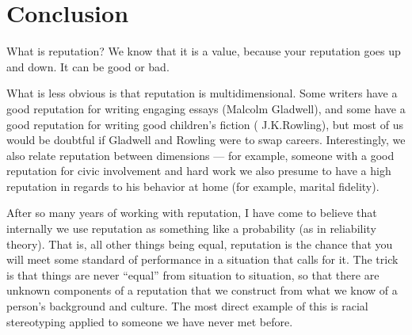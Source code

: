 \section{Conclusion}

\begin{comment}
Used to filter too much information, as in page rank.
But also used to encourage desirable behavior
(and discourage undesirable behavior).

Does a vandal to Wikipedia care that his reputation is
tarnished?  What kind of punishment is this?

Applications: peer review, text trust, sexual offender registry, job references.
Can we use reputation to figure out whether people
fit into a company culture?

What if web search rankings were done incrementally
instead of globally?  Would this give higher reputation
to \textit{fresh} parts of the web, and gracefully
phase out crufty parts?  Crucial to this would be the
need to update reputation based on page views, or
people following links from Facebook/Google, so that
we know that a static page is still actually relevant.
\end{comment}

What is reputation?  We know that it is a value, because your reputation goes
up and down. It can be good or bad.

What is less obvious is that reputation is multidimensional.  Some writers have
a good reputation for writing engaging essays (\eg Malcolm Gladwell), and some
have a good reputation for writing good children's fiction (\eg
J.\thinspace K.\thinspace Rowling),
but most of us would be doubtful if Gladwell and Rowling were to swap careers.
Interestingly, we also relate reputation between
dimensions --- for example, someone
with a good reputation for civic involvement and hard work we also presume
to have a high reputation in regards to his behavior at home (for example,
marital fidelity).

After so many years of working with reputation, I have come to believe that
internally we use reputation as something like a probability (as in
reliability theory).
That is, all other things being equal, reputation is the chance that you
will meet some standard of performance in a situation that calls for it.
The trick is that things are never ``equal'' from situation to
situation, so that there are unknown components of a reputation that we
construct from what we know of a person's background and culture.
The most direct example of this is racial stereotyping applied to
someone we have never met before.


